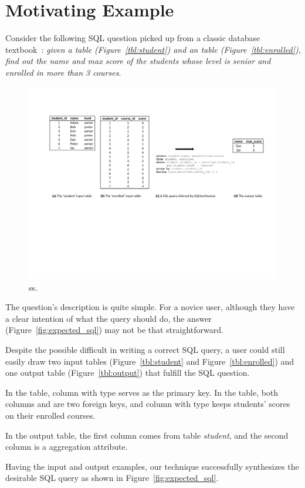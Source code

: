 \section{Motivating Example}
\label{sec:example}

Consider the following SQL question picked up from a classic
database textbook~\cite{cowbook}: \textit{given a  table (Figure~\ref{tbl:student})
and an  table (Figure~\ref{tbl:enrolled}), find out the name and max score of the
students whose level is senior and enrolled in more than 3 courses}.


\begin{figure}[t]
  \centering
  \includegraphics[scale=0.70]{motivating}
  \vspace*{-1.0ex}\caption {{\label{fig:motivating} ss.
}}
\end{figure}


The question's description is quite simple.
For a novice user, although they have a clear
intention of what the query should do, the answer (Figure~\ref{fig:expected_sql}) may
not be that straightforward. 

Despite the possible difficult in writing a correct SQL query,
a user could still easily draw
two input tables (Figure~\ref{tbl:student} and Figure~\ref{tbl:enrolled})
and one output table (Figure~\ref{tbl:output}) that fulfill the
SQL question.

In the  table, column {} with
 type serves as the primary key. 
In the  table, both columns {} and
{} are two foreign keys, and column {}
with  type keeps students' scores on their enrolled courses.

In the output table, the first column  {}
comes from table \textit{student}, and the second column {}
is a aggregation attribute.%

Having the input and output examples, our technique successfully synthesizes
the desirable SQL query as shown in Figure~\ref{fig:expected_sql}.
